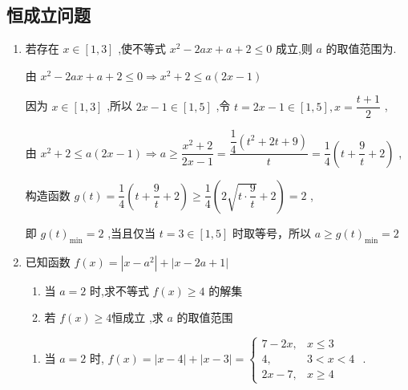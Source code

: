 \subsection*{恒成立问题}
\begin{enumerate}
    \item 若存在 $x \in  \left\lbrack  {1,3}\right\rbrack$ ,使不等式 ${x}^{2} - {2ax} + a + 2 \leq  0$ 成立,则 $a$ 的取值范围为.
    \begin{jieda}
        由 ${x}^{2} - {2ax} + a + 2 \leq  0 \Longrightarrow  {x}^{2} + 2 \leq  a\left( {{2x} - 1}\right)$

        因为 $x \in  \left\lbrack  {1,3}\right\rbrack$ ,所以 ${2x} - 1 \in  \left\lbrack  {1,5}\right\rbrack$ ,令 $t = {2x} - 1 \in  \left\lbrack  {1,5}\right\rbrack  ,x = \dfrac{t + 1}{2}$ ,
        
        由 ${x}^{2} + 2 \leq  a\left( {{2x} - 1}\right)  \Longrightarrow  a \geq  \dfrac{{x}^{2} + 2}{{2x} - 1} = \dfrac{\dfrac{1}{4}\left( {{t}^{2} + {2t} + 9}\right) }{t} = \dfrac{1}{4}\left( {t + \dfrac{9}{t} + 2}\right)$ ,
        
        构造函数 $g\left( t\right)  = \dfrac{1}{4}\left( {t + \dfrac{9}{t} + 2}\right)  \geq  \dfrac{1}{4}\left( {2\sqrt{t \cdot  \dfrac{9}{t}} + 2}\right)  = 2$ ,
        
        即 $g{\left( t\right) }_{\min } = 2$ ,当且仅当 $t = 3 \in  \left\lbrack  {1,5}\right\rbrack$ 时取等号，所以 $a \geq  g{\left( t\right) }_{\min } = 2$
    \end{jieda} 

    \item 已知函数 $f\left( x\right)  = \left| {x - {a}^{2}}\right|  + \left| {x - {2a} + 1}\right|$
    \begin{enumerate}
        \item 当 $a = 2$ 时,求不等式 $f\left( x\right)  \geq  4$ 的解集
        \item 若 $f\left( x\right)  \geq  4$恒成立 ,求 $a$ 的取值范围
    \end{enumerate}
    \begin{jieda}
        \begin{enumerate}
        \item 当 $a = 2$ 时, $f\left( x\right)  = \left| {x - 4}\right|  + \left| {x - 3}\right| = \left\{\begin{array}{ll}
             7 - {2x}, & x \leq  3  \\
             4, & 3 < x < 4 \\
             {2x} - 7, & x \geq  4
        \end{array}\right.$ .
        

\end{enumerate}
\end{jieda}
\end{enumerate}
